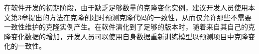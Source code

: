 在软件开发的初期阶段，由于缺乏足够数量的克隆变化实例，建议开发人员使用本文第3章提出的方法在克隆创建时预测克隆代码的一致性，从而仅允许那些不需要一致性维护的克隆实例产生。在软件演化到了足够的版本时，随着来自其自己的克隆变化数据的增加，开发人员可以使用自身数据重新训练模型以预测项目中克隆变化的一致性。


